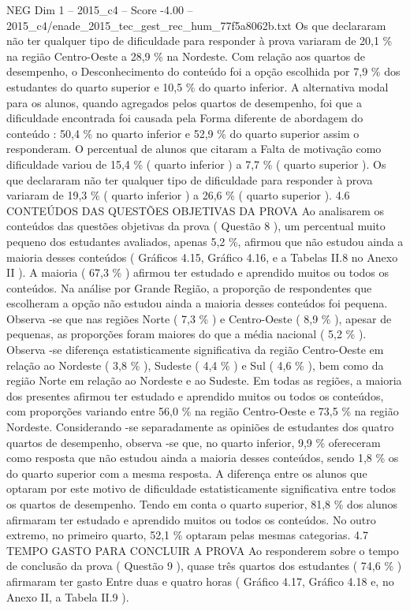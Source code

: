 \begin{textsample}{NEG Dim 1 – 2015\_c4 – Score -4.00 – 2015\_c4/enade\_2015\_tec\_gest\_rec\_hum\_77f5a8062b.txt}
Os que declararam não ter qualquer tipo de dificuldade para responder à prova variaram de 20,1 \% na região Centro-Oeste a 28,9 \% na Nordeste.
Com relação aos quartos de desempenho, o Desconhecimento do conteúdo foi a opção escolhida por 7,9 \% dos estudantes do quarto superior e 10,5 \% do quarto inferior.
A alternativa modal para os alunos, quando agregados pelos quartos de desempenho, foi que a dificuldade encontrada foi causada pela Forma diferente de abordagem do conteúdo : 50,4 \% no quarto inferior e 52,9 \% do quarto superior assim o responderam.
O percentual de alunos que citaram a Falta de motivação como dificuldade variou de 15,4 \% ( quarto inferior ) a 7,7 \% ( quarto superior ).
Os que declararam não ter qualquer tipo de dificuldade para responder à prova variaram de 19,3 \% ( quarto inferior ) a 26,6 \% ( quarto superior ). 4.6 CONTEÚDOS DAS QUESTÕES OBJETIVAS DA PROVA Ao analisarem os conteúdos das questões objetivas da prova ( Questão 8 ), um percentual muito pequeno dos estudantes avaliados, apenas 5,2 \%, afirmou que não estudou ainda a maioria desses conteúdos ( Gráficos 4.15, Gráfico 4.16, e a Tabelas II.8 no Anexo II ).
A maioria ( 67,3 \% ) afirmou ter estudado e aprendido muitos ou todos os conteúdos.
Na análise por Grande Região, a proporção de respondentes que escolheram a opção não estudou ainda a maioria desses conteúdos foi pequena.
Observa -se que nas regiões Norte ( 7,3 \% ) e Centro-Oeste ( 8,9 \% ), apesar de pequenas, as proporções foram maiores do que a média nacional ( 5,2 \% ).
Observa -se diferença estatisticamente significativa da região Centro-Oeste em relação ao Nordeste ( 3,8 \% ), Sudeste ( 4,4 \% ) e Sul ( 4,6 \% ), bem como da região Norte em relação ao Nordeste e ao Sudeste.
Em todas as regiões, a maioria dos presentes afirmou ter estudado e aprendido muitos ou todos os conteúdos, com proporções variando entre 56,0 \% na região Centro-Oeste e 73,5 \% na região Nordeste.
Considerando -se separadamente as opiniões de estudantes dos quatro quartos de desempenho, observa -se que, no quarto inferior, 9,9 \% ofereceram como resposta que não estudou ainda a maioria desses conteúdos, sendo 1,8 \% os do quarto superior com a mesma resposta.
A diferença entre os alunos que optaram por este motivo de dificuldade estatisticamente significativa entre todos os quartos de desempenho.
Tendo em conta o quarto superior, 81,8 \% dos alunos afirmaram ter estudado e aprendido muitos ou todos os conteúdos.
No outro extremo, no primeiro quarto, 52,1 \% optaram pelas mesmas categorias. 4.7 TEMPO GASTO PARA CONCLUIR A PROVA Ao responderem sobre o tempo de conclusão da prova ( Questão 9 ), quase três quartos dos estudantes ( 74,6 \% ) afirmaram ter gasto Entre duas e quatro horas ( Gráfico 4.17, Gráfico 4.18 e, no Anexo II, a Tabela II.9 ).

\end{textsample}
